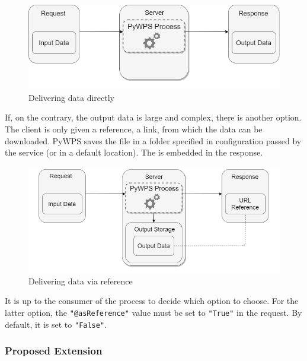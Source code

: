 \begin{figure}[H] \centering
  \includegraphics[width=350pt]{./pictures/optionone.png}
      \caption[Delivering data directly]{Delivering data directly}
      \label{fig:optionone}
  \end{figure}

  If, on the contrary, the output data is large and complex, there is
  another option. The client is only given a reference, a 
  link, from which the data can be downloaded. PyWPS saves the file in
  a folder specified in configuration passed by the service (or in a
  default location). The  is embedded in the 
  response. \cite{pywpsurl}

\begin{figure}[H] \centering
  \includegraphics[width=370pt]{./pictures/optiontwo.png}
      \caption[Delivering data via  reference]{Delivering data via  reference}
      \label{fig:optiontwo}
  \end{figure}

  It is up to the consumer of the process to decide which option to
  choose. For the latter option, the \texttt{"@asReference"} value
  must be set to \texttt{"True"} in the request. \cite{asref} By
  default, it is set to \texttt{"False"}.


\subsubsection{Proposed Extension} 


